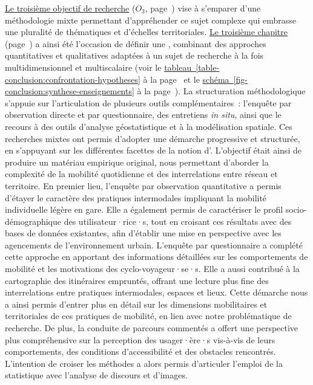 \begin{refsegment}
\hyperref[objectif-3]{Le troisième objectif de recherche} (\(O_3\), page~\pageref{objectif-3}) vise à s'emparer d'une méthodologie mixte permettant d'appréhender ce sujet complexe qui embrasse une pluralité de thématiques et d'échelles territoriales. \hyperref[chap3:titre]{Le troisième chapitre} (page~\pageref{chap3:titre}) a ainsi été l’occasion de définir une , combinant des approches quantitatives et qualitatives adaptées à un sujet de recherche à la fois multidimensionnel et multiscalaire (voir le \hyperref[table-conclusion:confrontation-hypotheses]{tableau~\ref{table-conclusion:confrontation-hypotheses}} à la page~\pageref{table-conclusion:confrontation-hypotheses} et le \hyperref[fig-conclusion:synthese-enseignements]{schéma~\ref{fig-conclusion:synthese-enseignements}} à la page~\pageref{fig-conclusion:synthese-enseignements}). La structuration méthodologique s’appuie sur l’articulation de plusieurs outils complémentaires~: l’enquête par observation directe et par questionnaire, des entretiens \textsl{in situ}, ainsi que le recours à des outils d'analyse géostatistique et à la modélisation spatiale. Ces recherches mixtes ont permis d’adopter une démarche progressive et structurée, en s’appuyant sur les différentes facettes de la notion d’. L’objectif était ainsi de produire un matériau empirique original, nous permettant d'aborder la complexité de la mobilité quotidienne et des interrelations entre réseau et territoire. En premier lieu, l’enquête par observation quantitative a permis d'étayer le caractère  des pratiques intermodales impliquant la mobilité individuelle légère en gare. Elle a également permis de caractériser le profil socio-démographique des utilisateur·rice·s, tout en croisant ces résultats avec des bases de données existantes, afin d’établir une mise en perspective avec les agencements de l’environnement urbain. L’enquête par questionnaire a complété cette approche en apportant des informations détaillées sur les comportements de mobilité et les motivations des cyclo-voyageur·se·s. Elle a aussi contribué à la cartographie des itinéraires empruntés, offrant une lecture plus fine des interrelations entre pratiques intermodales, espaces et lieux. Cette démarche nous a ainsi permis d'entrer plus en détail sur les dimensions mobilitaires et territoriales de ces pratiques de mobilité, en lien avec notre problématique de recherche. De plus, la conduite de parcours commentés a offert une perspective plus compréhensive sur la \gls{perception} des usager·ère·s vis-à-vis de leurs comportements, des conditions d’accessibilité et des obstacles rencontrés. L'intention de croiser les méthodes a alors permis d’articuler l'emploi de la statistique avec l’analyse de discours et d'images.%


\end{refsegment}
